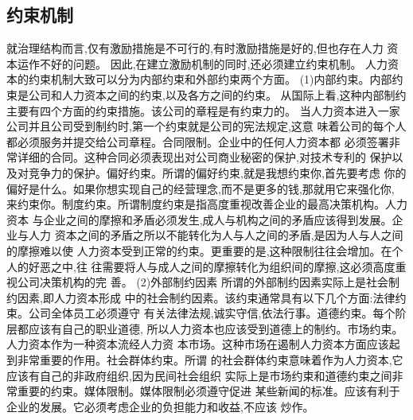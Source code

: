 \subsection{约束机制}
就治理结构而言,仅有激励措施是不可行的,有时激励措施是好的,但也存在人力
资本运作不好的问题。 因此,在建立激励机制的同时,还必须建立约束机制。 人力资
本的约束机制大致可以分为内部约束和外部约束两个方面。
(1)内部约束。内部约束是公司和人力资本之间的约束,以及各方之间的约束。
从国际上看,这种内部制约主要有四个方面的约束措施。该公司的章程是有约束力的。
当人力资本进入一家公司并且公司受到制约时,第一个约束就是公司的宪法规定,这意
味着公司的每个人都必须服务并提交给公司章程。合同限制。企业中的任何人力资本都
必须签署非常详细的合同。这种合同必须表现出对公司商业秘密的保护,对技术专利的
保护以及对竞争力的保护。偏好约束。所谓的偏好约束,就是我想约束你,首先要考虑
你的偏好是什么。如果你想实现自己的经营理念,而不是更多的钱,那就用它来强化你,
来约束你。制度约束。所谓制度约束是指高度重视改善企业的最高决策机构。人力资本
与企业之间的摩擦和矛盾必须发生,成人与机构之间的矛盾应该得到发展。企业与人力
资本之间的矛盾之所以不能转化为人与人之间的矛盾,是因为人与人之间的摩擦难以使
人力资本受到正常的约束。更重要的是,这种限制往往会增加。在个人的好恶之中,往
往需要将人与成人之间的摩擦转化为组织间的摩擦,这必须高度重视公司决策机构的完
善。
(2)外部制约因素 所谓的外部制约因素实际上是社会制约因素,即人力资本形成
中的社会制约因素。该约束通常具有以下几个方面:法律约束。公司全体员工必须遵守
有关法律法规,诚实守信,依法行事。道德约束。每个阶层都应该有自己的职业道德,
所以人力资本也应该受到道德上的制约。市场约束。人力资本作为一种资本流经人力资
本市场。这种市场在遏制人力资本方面应该起到非常重要的作用。社会群体约束。所谓
的社会群体约束意味着作为人力资本,它应该有自己的非政府组织,因为民间社会组织
实际上是市场约束和道德约束之间非常重要的约束。媒体限制。媒体限制必须遵守促进
某些新闻的标准。应该有利于企业的发展。它必须考虑企业的负担能力和收益,不应该
炒作。
